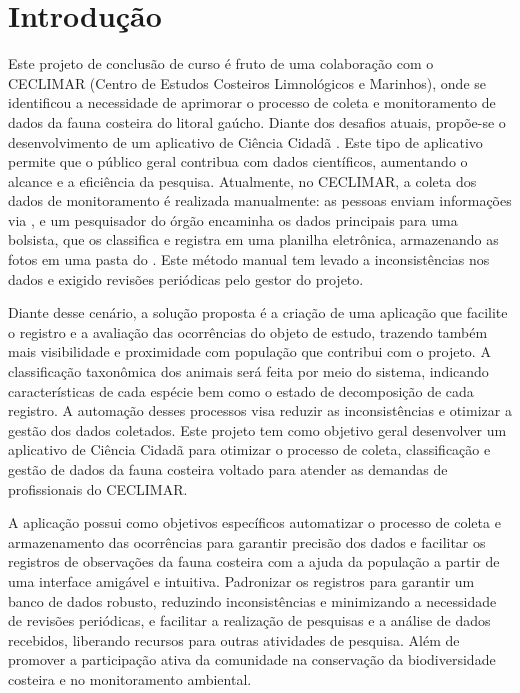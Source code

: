 
\chapter{Introdução} \label{chapter:intro}

Este projeto de conclusão de curso é fruto de uma colaboração com o CECLIMAR (Centro de Estudos Costeiros 
Limnológicos e Marinhos), onde se identificou a necessidade de aprimorar o processo de coleta e monitoramento 
de dados da fauna costeira do litoral gaúcho. Diante dos desafios atuais, propõe-se o desenvolvimento de um aplicativo de 
Ciência Cidadã \cite{Martins_Cabral_2021}. Este tipo de aplicativo permite que o público geral contribua 
com dados científicos, aumentando o alcance e a eficiência da pesquisa.
Atualmente, no CECLIMAR, a coleta dos dados de monitoramento é realizada manualmente: as pessoas enviam 
informações via , e um pesquisador do órgão encaminha os dados principais para uma 
bolsista, que os classifica e registra em uma planilha eletrônica, armazenando as fotos em uma pasta do 
. Este método manual tem levado a inconsistências nos dados e exigido revisões 
periódicas pelo gestor do projeto.

Diante desse cenário, a solução proposta é a criação de uma aplicação que facilite o registro e a avaliação das ocorrências  
do objeto de estudo, trazendo também mais visibilidade e proximidade com população que contribui com o projeto. 
A classificação taxonômica dos animais será feita por meio do 
sistema, indicando características de cada espécie bem como o estado de decomposição de cada registro. 
A automação desses processos visa reduzir as inconsistências e otimizar a gestão dos dados coletados.
Este projeto tem como objetivo geral desenvolver um aplicativo de Ciência Cidadã para otimizar o processo 
de coleta, classificação e gestão de dados da fauna costeira voltado para atender as demandas de 
profissionais do CECLIMAR.

A aplicação possui como objetivos específicos automatizar o processo de coleta e armazenamento das 
ocorrências para garantir precisão dos dados e facilitar os registros de observações da fauna costeira 
com a ajuda da população a partir de uma interface amigável e intuitiva. Padronizar os registros 
para garantir um banco de dados robusto, reduzindo inconsistências e minimizando a necessidade de 
revisões periódicas, e facilitar a realização de pesquisas e a 
análise de dados recebidos, liberando recursos para outras atividades de pesquisa. Além de promover 
a participação ativa da comunidade na conservação da biodiversidade costeira e no monitoramento ambiental.

